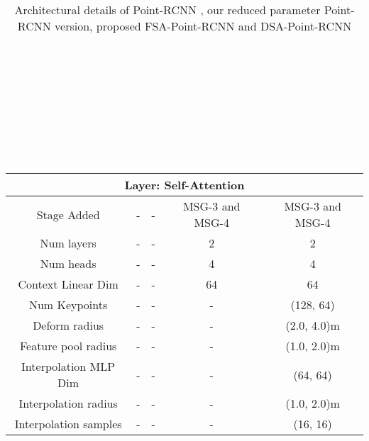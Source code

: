 \documentclass[10pt,twocolumn,letterpaper]{article}
\begin{document}
\begin{table*}[ht]
\begin{tabular*}{\textwidth}{|c||c|c|c|c|}
         \hline
         \hline
        \multicolumn{5}{|c|}{Layer: Self-Attention}  \\
        \hline
        \hline
        Stage Added & - & - & MSG-3 and MSG-4 & MSG-3 and MSG-4 \\
         \hline
          Num layers & - & - & 2 & 2 \\
         \hline
          Num heads & - & - & 4 & 4 \\
         \hline
         Context Linear Dim & - & - & 64 & 64 \\
         \hline
         Num Keypoints & - & - & - & (128, 64) \\
         \hline
         Deform radius & - & - & - & (2.0, 4.0)m \\
         \hline
         Feature pool radius & - & - & - & (1.0, 2.0)m \\
         \hline
         Interpolation MLP Dim & - & - & - & (64, 64) \\
         \hline
         Interpolation radius & - & - & - & (1.0, 2.0)m \\
         \hline
         Interpolation samples & - & - & - & (16, 16) \\
         \hline 
    \end{tabular*}
    \caption{Architectural details of Point-RCNN \cite{PointRCNN}, our reduced parameter Point-RCNN version, proposed FSA-Point-RCNN and DSA-Point-RCNN \\ \\  \\  \\ \\ \\ \\ \\  \\}
    \label{tab:pointrcnn_archi}
    \vspace{-3.5cm}
\end{table*} \setlength{\tabcolsep}{15.2pt}
\end{document}

